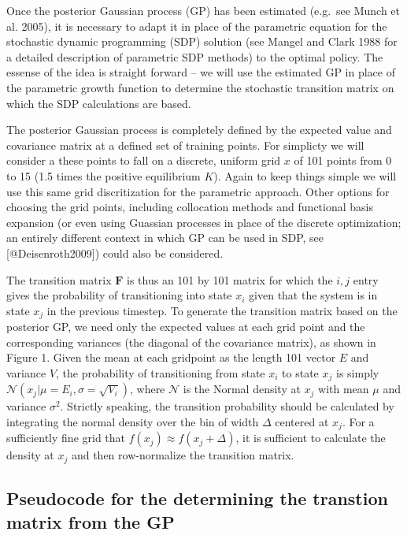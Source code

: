 \documentclass[author-year, review]{elsarticle} %
\begin{document}
Once the posterior Gaussian process (GP) has been estimated (e.g.~see
Munch et al. 2005), it is necessary to adapt it in place of the
parametric equation for the stochastic dynamic programming (SDP)
solution (see Mangel and Clark 1988 for a detailed description of
parametric SDP methods) to the optimal policy. The essense of the idea
is straight forward -- we will use the estimated GP in place of the
parametric growth function to determine the stochastic transition matrix
on which the SDP calculations are based.

The posterior Gaussian process is completely defined by the expected
value and covariance matrix at a defined set of training points. For
simplicty we will consider a these points to fall on a discrete, uniform
grid $x$ of 101 points from 0 to 15 (1.5 times the positive equilibrium
$K$). Again to keep things simple we will use this same grid
discritization for the parametric approach. Other options for choosing
the grid points, including collocation methods and functional basis
expansion (or even using Guassian processes in place of the discrete
optimization; an entirely different context in which GP can be used in
SDP, see {[}@Deisenroth2009{]}) could also be considered.

The transition matrix $\mathbf{F}$ is thus an 101 by 101 matrix for
which the ${i,j}$ entry gives the probability of transitioning into
state $x_i$ given that the system is in state $x_j$ in the previous
timestep. To generate the transition matrix based on the posterior GP,
we need only the expected values at each grid point and the
corresponding variances (the diagonal of the covariance matrix), as
shown in Figure 1. Given the mean at each gridpoint as the length 101
vector $E$ and variance $V$, the probability of transitioning from state
$x_i$ to state $x_j$ is simply
$\mathcal{N}\left(x_j \vert  \mu = E_i, \sigma = \sqrt{V_i}\right)$,
where $\mathcal{N}$ is the Normal density at $x_j$ with mean $\mu$ and
variance $\sigma^2$. Strictly speaking, the transition probability
should be calculated by integrating the normal density over the bin of
width $\Delta$ centered at $x_j$. For a sufficiently fine grid that
$f(x_j) \approx f(x_j + \Delta)$, it is sufficient to calculate the
density at $x_j$ and then row-normalize the transition matrix.

\subsection{Pseudocode for the determining the transtion matrix from the
GP}
\end{document}

